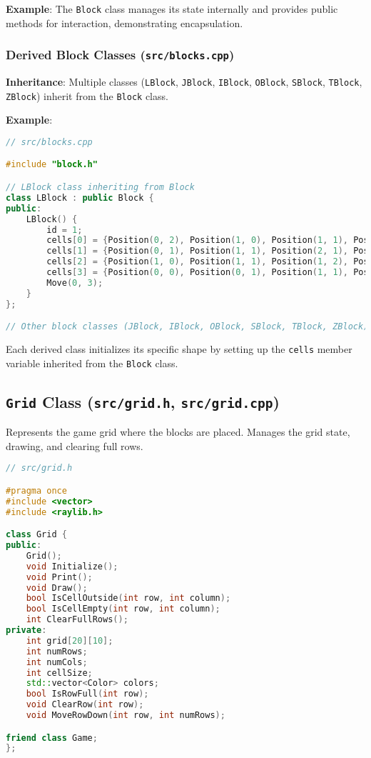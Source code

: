 \documentclass{article}
\begin{document}
\textbf{Example}: The \texttt{Block} class manages its state internally and provides public methods for interaction, demonstrating encapsulation.

\subsubsection{Derived Block Classes (\texttt{src/blocks.cpp})}

\textbf{Inheritance}: Multiple classes (\texttt{LBlock}, \texttt{JBlock}, \texttt{IBlock}, \texttt{OBlock}, \texttt{SBlock}, \texttt{TBlock}, \texttt{ZBlock}) inherit from the \texttt{Block} class.

\textbf{Example}:

\begin{lstlisting}[language=C++]
// src/blocks.cpp

#include "block.h"

// LBlock class inheriting from Block
class LBlock : public Block {
public:
    LBlock() {
        id = 1;
        cells[0] = {Position(0, 2), Position(1, 0), Position(1, 1), Position(1, 2)};
        cells[1] = {Position(0, 1), Position(1, 1), Position(2, 1), Position(2, 2)};
        cells[2] = {Position(1, 0), Position(1, 1), Position(1, 2), Position(2, 0)};
        cells[3] = {Position(0, 0), Position(0, 1), Position(1, 1), Position(2, 1)};
        Move(0, 3);
    }
};

// Other block classes (JBlock, IBlock, OBlock, SBlock, TBlock, ZBlock) defined similarly
\end{lstlisting}

Each derived class initializes its specific shape by setting up the \texttt{cells} member variable inherited from the \texttt{Block} class.

\subsection{\texttt{Grid} Class (\texttt{src/grid.h}, \texttt{src/grid.cpp})}

Represents the game grid where the blocks are placed. Manages the grid state, drawing, and clearing full rows.

\begin{lstlisting}[language=C++]
// src/grid.h

#pragma once
#include <vector>
#include <raylib.h>

class Grid {
public:
    Grid();
    void Initialize();
    void Print();
    void Draw();
    bool IsCellOutside(int row, int column);
    bool IsCellEmpty(int row, int column);
    int ClearFullRows();
private:
    int grid[20][10];
    int numRows;
    int numCols;
    int cellSize;
    std::vector<Color> colors;
    bool IsRowFull(int row);
    void ClearRow(int row);
    void MoveRowDown(int row, int numRows);

friend class Game;
};
\end{lstlisting}
\end{document}
